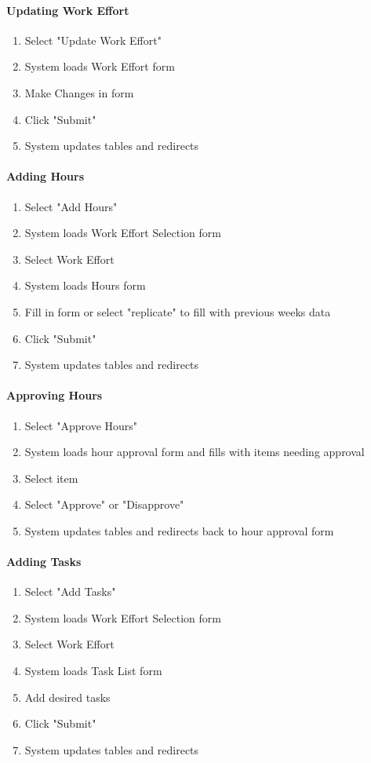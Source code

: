 \documentclass[letterpaper]{article}
\begin{document}
\paragraph{Updating Work Effort}
\begin{enumerate}
\item Select "Update Work Effort"
\item System loads Work Effort form
\item Make Changes in form
\item Click "Submit"
\item System updates tables and redirects
\end{enumerate}

\paragraph{Adding Hours}
\begin{enumerate}
\item Select "Add Hours"
\item System loads Work Effort Selection form
\item Select Work Effort
\item System loads Hours form
\item Fill in form or select "replicate" to fill with previous weeks data
\item Click "Submit"
\item System updates tables and redirects
\end{enumerate}

\paragraph{Approving Hours}
\begin{enumerate}
\item Select "Approve Hours"
\item System loads hour approval form and fills with items needing approval
\item Select item
\item Select "Approve" or "Disapprove"
\item System updates tables and redirects back to hour approval form
\end{enumerate}

\paragraph{Adding Tasks}
\begin{enumerate}
\item Select "Add Tasks"
\item System loads Work Effort Selection form
\item Select Work Effort
\item System loads Task List form
\item Add desired tasks
\item Click "Submit"
\item System updates tables and redirects
\end{enumerate}
\end{document}
